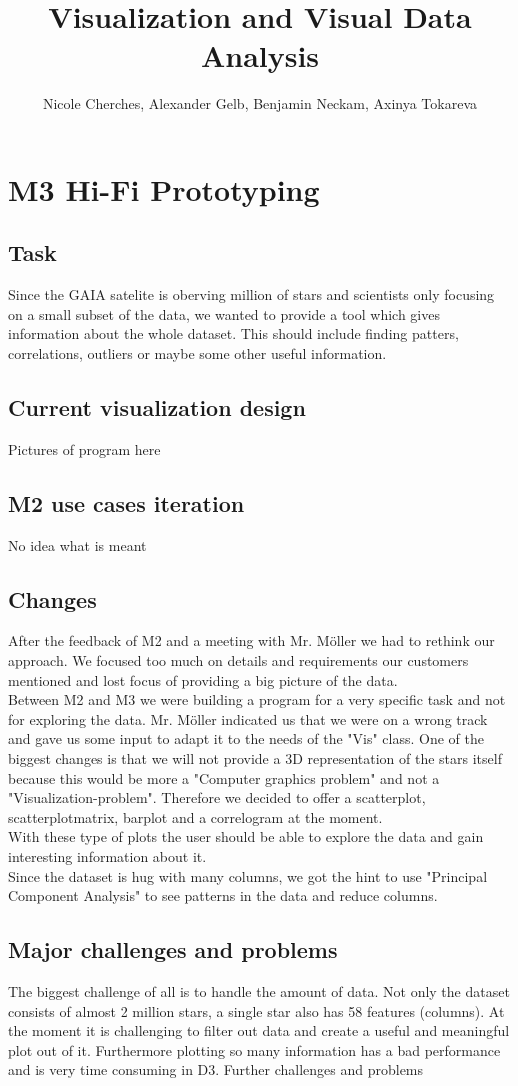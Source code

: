 \documentclass{article}
\begin{document}
\title{Visualization and Visual Data Analysis}
\author{Nicole Cherches, Alexander Gelb, Benjamin Neckam, Axinya Tokareva}
\maketitle
\section{M3  Hi-Fi Prototyping}
\subsection{Task}
Since the GAIA satelite is oberving million of stars and scientists only focusing on a small subset of the data, we wanted to provide a tool which gives information about the whole dataset. This should include finding patters, correlations, outliers or maybe some other useful information.\\
\subsection{Current visualization design}
{Pictures of program here}
\subsection{M2 use cases iteration}
{No idea what is meant}
\subsection{Changes}
After the feedback of M2 and a meeting with Mr. Möller we had to rethink our approach. We focused too much on details and requirements our customers mentioned and lost focus of providing a big picture of the data.\\
Between M2 and M3 we were building a program for a very specific task and not for exploring the data. Mr. Möller indicated us that we were on a wrong track and gave us some input to adapt it to the needs of the "Vis" class. One of the biggest changes is that we will not provide a 3D representation of the stars itself because this would be more a "Computer graphics problem" and not a "Visualization-problem". Therefore we decided to offer a scatterplot, scatterplotmatrix, barplot and a correlogram at the moment.\\
With these type of plots the user should be able to explore the data and gain interesting information about it.\\
Since the dataset is hug with many columns, we got the hint to use "Principal Component Analysis" to see patterns in the data and reduce columns.
\subsection{Major challenges and problems}
The biggest challenge of all is to handle the amount of data. Not only the dataset consists of almost 2 million stars, a single star also has 58 features (columns). At the moment it is challenging to filter out data and create a useful and meaningful plot out of it.  Furthermore plotting so many information has a bad performance and is very time consuming in D3.
{Further challenges and problems}
\end{document}
